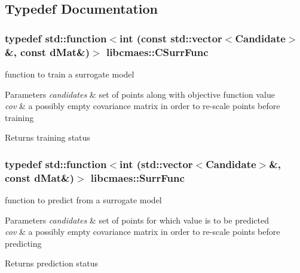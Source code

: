 \subsection{Typedef Documentation}
\hypertarget{namespacelibcmaes_ac7e88b4dfdaf94d6fa1e831ed5d9437e}{
\subsubsection[{C\+Surr\+Func}]{\setlength{\rightskip}{0pt plus 5cm}typedef std\+::function$<$int (const std\+::vector$<${\bf Candidate}$>$\&, const d\+Mat\&)$>$ {\bf libcmaes\+::\+C\+Surr\+Func}}}\label{namespacelibcmaes_ac7e88b4dfdaf94d6fa1e831ed5d9437e}


function to train a surrogate model 


\begin{DoxyParams}{Parameters}
{\em candidates} & set of points along with objective function value \\
\hline
{\em cov} & a possibly empty covariance matrix in order to re-\/scale points before training \\
\hline
\end{DoxyParams}
\begin{DoxyReturn}{Returns}
training status 
\end{DoxyReturn}
\hypertarget{namespacelibcmaes_a7115c4ca01f7e080f5c39c076242bf00}{
\subsubsection[{Surr\+Func}]{\setlength{\rightskip}{0pt plus 5cm}typedef std\+::function$<$int (std\+::vector$<${\bf Candidate}$>$\&, const d\+Mat\&)$>$ {\bf libcmaes\+::\+Surr\+Func}}}\label{namespacelibcmaes_a7115c4ca01f7e080f5c39c076242bf00}


function to predict from a surrogate model 


\begin{DoxyParams}{Parameters}
{\em candidates} & set of points for which value is to be predicted \\
\hline
{\em cov} & a possibly empty covariance matrix in order to re-\/scale points before predicting \\
\hline
\end{DoxyParams}
\begin{DoxyReturn}{Returns}
prediction status 
\end{DoxyReturn}

